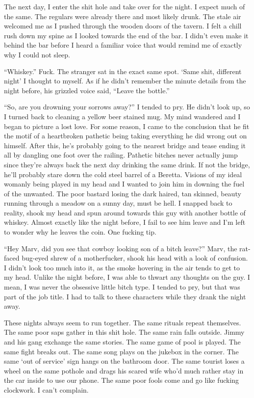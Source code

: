 The next day, I enter the shit hole and take over for the night. I
expect much of the same. The regulars were already there and most
likely drunk. The stale air welcomed me as I pushed through the
wooden doors of the tavern. I felt a chill rush down my spine as I
looked towards the end of the bar. I didn't even make it
behind the bar before I heard a familiar voice that would remind me
of exactly why I could not sleep.



``Whiskey.'' Fuck. The stranger sat in the exact same
spot. `Same shit, different night' I thought to myself.
As if he didn't remember the minute details from the night
before, his grizzled voice said, ``Leave the
bottle.''



``So, are you drowning your sorrows away?'' I tended to
pry. He didn't look up, so I turned back to cleaning a yellow
beer stained mug. My mind wandered and I began to picture a lost
love. For some reason, I came to the conclusion that he fit the
motif of a heartbroken pathetic being taking everything he did
wrong out on himself. After this, he's probably going to the
nearest bridge and tease ending it all by dangling one foot over
the railing. Pathetic bitches never actually jump since
they're always back the next day drinking the same drink. If
not the bridge, he'll probably stare down the cold steel
barrel of a Beretta. Visions of my ideal womanly being played in my
head and I wanted to join him in downing the fuel of the unwanted.
The poor bastard losing the dark haired, tan skinned, beauty
running through a meadow on a sunny day, must be hell. I snapped
back to reality, shook my head and spun around towards this guy
with another bottle of whiskey. Almost exactly like the night
before, I fail to see him leave and I'm left to wonder why he
leaves the coin. One fucking tip.



``Hey Marv, did you see that cowboy looking son of a bitch
leave?'' Marv, the rat-faced bug-eyed shrew of a motherfucker,
shook his head with a look of confusion. I didn't look too
much into it, as the smoke hovering in the air tends to get to my
head. Unlike the night before, I was able to thwart any thoughts on
the guy. I mean, I was never the obsessive little bitch type. I
tended to pry, but that was part of the job title. I had to talk to
these characters while they drank the night away.



These nights always seem to run together. The same rituals repeat
themselves. The same poor saps gather in this shit hole. The same
rain falls outside. Jimmy and his gang exchange the same stories.
The same game of pool is played. The same fight breaks out. The
same song plays on the jukebox in the corner. The same `out
of service' sign hangs on the bathroom door. The same tourist
loses a wheel on the same pothole and drags his scared wife
who'd much rather stay in the car inside to use our phone.
The same poor fools come and go like fucking clockwork. I
can't complain.



